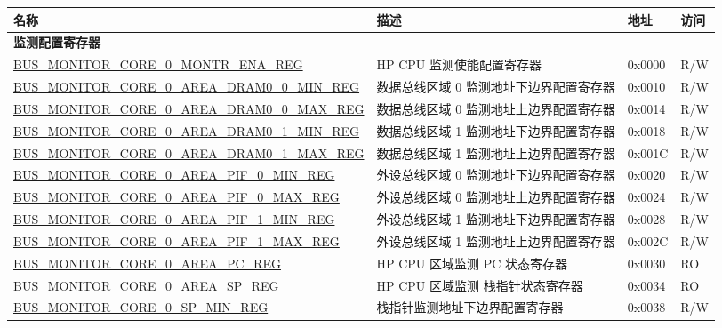 \begin{longtable}{ |p{10cm} | p{9cm}| l | l | }
\hline\rowcolor{lightgray}
{\bfseries 名称} & {\bfseries 描述} &  {\bfseries 地址} & {\bfseries 访问} \\ \hline
\endhead
\multicolumn{4}{|l|}{\textbf{监测配置寄存器}} \\ \hline
\hyperref[regdesc:BUSMONITORCORE0MONTRENAREG]{BUS\_MONITOR\_CORE\_0\_MONTR\_ENA\_REG} & HP CPU 监测使能配置寄存器& 0x0000 & R/W \\ \hline
\hyperref[regdesc:BUSMONITORCORE0AREADRAM00MINREG]{BUS\_MONITOR\_CORE\_0\_AREA\_DRAM0\_0\_MIN\_REG} & 数据总线区域 0 监测地址下边界配置寄存器 & 0x0010 & R/W \\ \hline
\hyperref[regdesc:BUSMONITORCORE0AREADRAM00MAXREG]{BUS\_MONITOR\_CORE\_0\_AREA\_DRAM0\_0\_MAX\_REG} & 数据总线区域 0 监测地址上边界配置寄存器 & 0x0014 & R/W \\ \hline
\hyperref[regdesc:BUSMONITORCORE0AREADRAM01MINREG]{BUS\_MONITOR\_CORE\_0\_AREA\_DRAM0\_1\_MIN\_REG} & 数据总线区域 1 监测地址下边界配置寄存器 & 0x0018 & R/W \\ \hline
\hyperref[regdesc:BUSMONITORCORE0AREADRAM01MAXREG]{BUS\_MONITOR\_CORE\_0\_AREA\_DRAM0\_1\_MAX\_REG} & 数据总线区域 1 监测地址上边界配置寄存器 & 0x001C & R/W \\ \hline
\hyperref[regdesc:BUSMONITORCORE0AREAPIF0MINREG]{BUS\_MONITOR\_CORE\_0\_AREA\_PIF\_0\_MIN\_REG} & 外设总线区域 0 监测地址下边界配置寄存器 & 0x0020 & R/W \\ \hline
\hyperref[regdesc:BUSMONITORCORE0AREAPIF0MAXREG]{BUS\_MONITOR\_CORE\_0\_AREA\_PIF\_0\_MAX\_REG} & 外设总线区域 0 监测地址上边界配置寄存器 & 0x0024 & R/W \\ \hline
\hyperref[regdesc:BUSMONITORCORE0AREAPIF1MINREG]{BUS\_MONITOR\_CORE\_0\_AREA\_PIF\_1\_MIN\_REG} & 外设总线区域 1 监测地址下边界配置寄存器 & 0x0028 & R/W \\ \hline
\hyperref[regdesc:BUSMONITORCORE0AREAPIF1MAXREG]{BUS\_MONITOR\_CORE\_0\_AREA\_PIF\_1\_MAX\_REG} & 外设总线区域 1 监测地址上边界配置寄存器 & 0x002C & R/W \\ \hline
\hyperref[regdesc:BUSMONITORCORE0AREAPCREG]{BUS\_MONITOR\_CORE\_0\_AREA\_PC\_REG} & HP CPU 区域监测 PC 状态寄存器 & 0x0030 & RO \\ \hline
\hyperref[regdesc:BUSMONITORCORE0AREASPREG]{BUS\_MONITOR\_CORE\_0\_AREA\_SP\_REG} & HP CPU 区域监测 栈指针状态寄存器  & 0x0034 & RO \\ \hline
\hyperref[regdesc:BUSMONITORCORE0SPMINREG]{BUS\_MONITOR\_CORE\_0\_SP\_MIN\_REG} & 栈指针监测地址下边界配置寄存器 & 0x0038 & R/W \\ \hline

\end{longtable}

